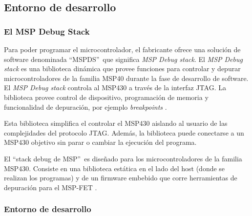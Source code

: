 

\subsection{Entorno de desarrollo}
\subsubsection{ El MSP Debug Stack}

Para poder programar el microcontrolador, el fabricante ofrece una solución de software denominada \textquotedblleft MSPDS\textquotedblright \ que significa \textit{MSP Debug stack}. El \textit{MSP Debug stack} es una biblioteca dinámica que provee funciones para controlar y depurar microcontroladores de la familia MSP40 durante la fase de desarrollo de software. El \textit{MSP Debug stack} controla al MSP430 a través de la interfaz JTAG. La biblioteca provee control de dispositivo, programación de memoria y funcionalidad de depuración, por ejemplo \textit{breakpoints} \cite{GuideMSPStack}.

Esta biblioteca simplifica el controlar el MSP430 aislando al usuario de las complejidades del protocolo JTAG. Además, la biblioteca puede conectarse a un MSP430 objetivo sin parar o cambiar la ejecución del programa.

El \textquotedblleft stack debug de MSP\textquotedblright \ es diseñado para los microcontroladores de la familia MSP430. Consiste en una biblioteca estática en el lado del host (donde se realizan los programas) y de un firmware embebido que corre herramientas de depuración para el MSP-FET \cite{GuideMSPStack}.

\subsubsection{Entorno de desarrollo}

